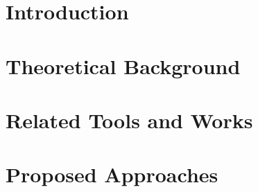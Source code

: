 \documentclass[12pt]{report}
\begin{document}

\setmainfont{Times New Roman}

\clearpage
{} 










% 



\listoftables
\listoffigures
\newpage


\chapter{Introduction}









\chapter{Theoretical Background}










\chapter{Related Tools and Works}
\label{chapter:related}



\chapter{Proposed Approaches}
\end{document}
